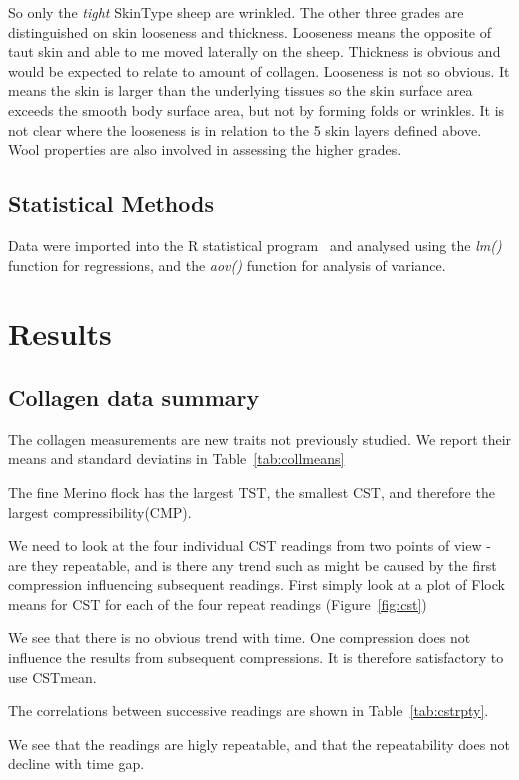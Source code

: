 \documentclass[titlepage]{article}  %
\begin{document}
So only the {\em tight} SkinType sheep are wrinkled. The other three grades are distinguished on skin looseness and thickness. Looseness means the opposite of taut skin and able to me moved laterally on the sheep. Thickness is obvious and would be expected to relate to amount of collagen. Looseness is not so obvious. It means the skin is larger than the underlying tissues so the skin surface area exceeds the smooth body surface area, but not by forming folds or wrinkles. It is not clear where the looseness is in relation to the 5 skin layers defined above. Wool properties are also involved in assessing the higher grades. 

\subsection{Statistical Methods}
Data were imported into the R statistical program~\cite{rprog:13} and analysed using the {\em lm()} function for regressions, and the {\em aov()} function for analysis of variance.

\section{Results}
\subsection{Collagen data summary}
The collagen measurements are new traits not previously studied. We report their means and standard deviatins in Table~\ref{tab:collmeans}

The fine Merino flock has the largest TST, the smallest CST, and therefore the largest compressibility(CMP).

We need to look at the four individual CST readings from two points of view - are they repeatable, and is there any trend such as might be caused by the first compression influencing subsequent readings. First simply look at a plot of Flock means for CST for each of the four repeat readings (Figure~\ref{fig:cst})

We see that there is no obvious trend with time. One compression does not influence the results from subsequent compressions. It is therefore satisfactory to use CSTmean.

The correlations between successive readings are shown in Table~\ref{tab:cstrpty}.

We see that the readings are higly repeatable, and that the repeatability does not decline with time gap.
\end{document}
